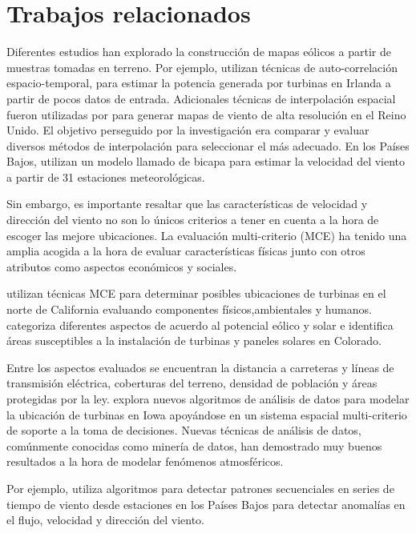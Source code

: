 \section{Trabajos relacionados}

Diferentes estudios han explorado la construcción de mapas eólicos a partir
 de muestras tomadas en terreno.
 Por ejemplo, \cite{haslett1989spacetime} utilizan técnicas de auto-correlación espacio-temporal, para estimar la
 potencia generada por turbinas en Irlanda a partir de pocos datos de entrada.
 Adicionales técnicas de interpolación espacial fueron utilizadas por \cite{luo2008acomparison} 
 para generar mapas de viento de alta resolución en el Reino Unido.
 El objetivo perseguido por la investigación era comparar y evaluar diversos
 métodos de interpolación para seleccionar el más adecuado.
 En los Países Bajos, \cite{stepek2011interpolating}  utilizan un modelo llamado de bicapa para estimar la velocidad del viento
 a partir de 31 estaciones meteorológicas.

Sin embargo, es importante resaltar que las características de velocidad
 y dirección del viento no son lo únicos criterios a tener en cuenta a la
 hora de escoger las mejore ubicaciones.
 La evaluación multi-criterio (MCE) ha tenido una amplia acogida a la hora
 de evaluar características físicas junto con otros atributos como aspectos
 económicos y sociales.
 
\cite{rodman2006ageographic}  utilizan técnicas MCE para determinar posibles ubicaciones de turbinas
 en el norte de California evaluando componentes físicos,ambientales y humanos. \cite{janke2010multicriteria}
 categoriza diferentes aspectos de acuerdo al potencial eólico y solar e
 identifica áreas susceptibles a la instalación de turbinas y paneles solares
 en Colorado.
 
 Entre los aspectos evaluados se encuentran la distancia a carreteras y
 líneas de transmisión eléctrica, coberturas del terreno, densidad de población
 y áreas protegidas por la ley. \cite{petrov2014utilization} explora nuevos algoritmos de análisis de datos para modelar la ubicación
 de turbinas en Iowa apoyándose en un sistema espacial multi-criterio de
 soporte a la toma de decisiones.
 Nuevas técnicas de análisis de datos, comúnmente conocidas como minería
 de datos, han demostrado muy buenos resultados a la hora de modelar fenómenos
 atmosféricos.
 
 Por ejemplo, \cite{yusof2014miningfrequent} utiliza algoritmos para detectar patrones secuenciales en series de tiempo
 de viento desde estaciones en los Países Bajos para detectar anomalías
 en el flujo, velocidad y dirección del viento.

